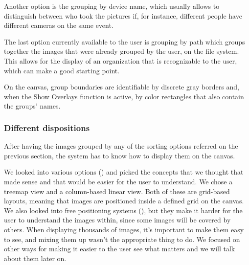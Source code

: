 Another option is the grouping by device name, which usually allows to distinguish between who took the pictures if, for instance, different people have different cameras on the same event.

The last option currently available to the user is grouping by path which groups together the images that were already grouped by the user, on the file system. This allows for the display of an organization that is recognizable to the user, which can make a good starting point.

On the canvas, group boundaries are identifiable by discrete gray borders and, when the Show Overlays function is active, by color rectangles that also contain the groups' names.


\subsubsection{Different dispositions}

After having the images grouped by any of the sorting options referred on the previous section, the system has to know how to display them on the canvas.

We looked into various options (\cite{Bederson:2001:PZI:502348.502359,Bruls:2000p3517,Chen:1998p2344,Girgensohn:2010,Heesch:2004p2675,Hsu:2009p2696,Porta:2006p416,Rodden:2001p731,Schaefer:2010p1871,Strong:2009p413}) and picked the concepts that we thought that made sense and that would be easier for the user to understand. We chose a treemap view and a column-based linear view. Both of these are grid-based layouts, meaning that images are positioned inside a defined grid on the canvas. We also looked into free positioning systems (\cite{Girgensohn:2010,Rodden:2001p731,Schaefer:2010p1871,Strong:2009p413}), but they make it harder for the user to understand the images within, since some images will be covered by others. When displaying thousands of images, it's important to make them easy to see, and mixing them up wasn't the appropriate thing to do. We focused on other ways for making it easier to the user see what matters and we will talk about them later on.


